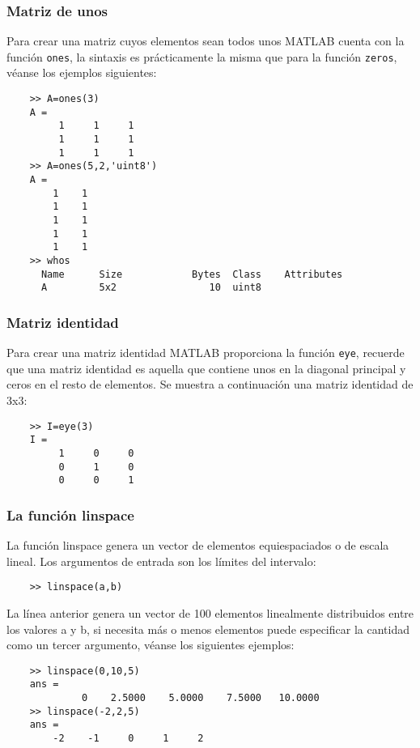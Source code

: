 \subsubsection{Matriz de unos}

Para crear una matriz cuyos elementos sean todos unos MATLAB cuenta con la función \texttt{ones}, la sintaxis 
es prácticamente la misma que para la función \texttt{zeros}, véanse los ejemplos siguientes:

\begin{verbatim}
	>> A=ones(3)
	A =
	     1     1     1
	     1     1     1
	     1     1     1
	>> A=ones(5,2,'uint8')
	A =
	    1    1
	    1    1
	    1    1
	    1    1
	    1    1
	>> whos
	  Name      Size            Bytes  Class    Attributes
	  A         5x2                10  uint8      
\end{verbatim}

\subsubsection{Matriz identidad}

Para crear una matriz identidad MATLAB proporciona la función \texttt{eye}, recuerde que una matriz 
identidad es aquella que contiene unos en la diagonal principal y ceros en el resto de elementos. 
Se muestra a continuación una matriz identidad de 3x3:

\begin{verbatim}
	>> I=eye(3)
	I =
	     1     0     0
	     0     1     0
	     0     0     1
\end{verbatim}

\subsubsection{La función linspace}

La función linspace genera un vector de elementos equiespaciados o de escala lineal. Los 
argumentos de entrada son los límites del intervalo:

\begin{verbatim}
	>> linspace(a,b)
\end{verbatim}

La línea anterior genera un vector de 100 elementos linealmente distribuidos entre los valores a y b, 
si necesita más o menos elementos puede especificar la cantidad como un tercer argumento, véanse 
los siguientes ejemplos:

\begin{verbatim}
	>> linspace(0,10,5)
	ans =
	         0    2.5000    5.0000    7.5000   10.0000
	>> linspace(-2,2,5)
	ans =
	    -2    -1     0     1     2
\end{verbatim}


